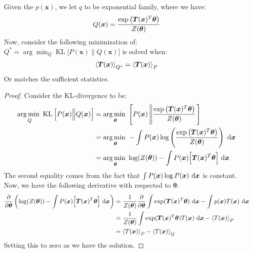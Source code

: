 \begin{proposition}
    Given the $p(\boldsymbol x)$, we let $q$ to be exponential family, where we have:
    \begin{equation*}
        Q(\boldsymbol x) = \frac{\exp\left( \boldsymbol T(\boldsymbol x)^T\boldsymbol \theta \right)}{Z(\boldsymbol \theta)}
    \end{equation*}
    Now, consider the following minimization of: $Q^* = \arg\min_{Q} \operatorname{KL}\Big[ P(\boldsymbol x) \Big\| Q(\boldsymbol x)  \Big]$ is solved when:
    \begin{equation*}
        \left\langle \boldsymbol T(\boldsymbol x) \right\rangle_{Q^*} = \left\langle \boldsymbol T(\boldsymbol x) \right\rangle_P
    \end{equation*}
    Or matches the sufficient statistics. 
\end{proposition}
\begin{proof}
    Consider the KL-divergence to be:
    \begin{equation*}
    \begin{aligned}
        \underset{Q}{\arg\min \ } \operatorname{KL}\Big[ P(\boldsymbol x) \Big\| Q(\boldsymbol x)  \Big] &= \underset{\boldsymbol \theta}{\arg\min \ }\left[  P(\boldsymbol x) \left\| \frac{\exp\left( \boldsymbol T(\boldsymbol x)^T\boldsymbol \theta \right)}{Z(\boldsymbol \theta)} \right. \right] \\
        &= \underset{\boldsymbol \theta}{\arg\min \ } - \int P(\boldsymbol x)\log\left( \frac{\exp\left( \boldsymbol T(\boldsymbol x)^T\boldsymbol \theta \right)}{Z(\boldsymbol \theta)} \right) \ \mathrm{d} \boldsymbol x \\
        &= \underset{\boldsymbol \theta}{\arg\min \ } \log(Z(\boldsymbol \theta)) - \int P(\boldsymbol x)\Big[ \boldsymbol T(\boldsymbol x)^T\boldsymbol \theta \Big] \ \mathrm{d} \boldsymbol x \\
    \end{aligned}
    \end{equation*}
    The second equality comes from the fact that $\int P(\boldsymbol x)\log P(\boldsymbol x)\ \mathrm{d}\boldsymbol x$ is constant. Now, we have the following derivative with respected to $\boldsymbol\theta$:
    \begin{equation*}
    \begin{aligned}
        \frac{\partial}{\partial \boldsymbol \theta}\left( \log(Z(\boldsymbol \theta)) - \int P(\boldsymbol x)\Big[ \boldsymbol T(\boldsymbol x)^T\boldsymbol \theta \Big] \ \mathrm{d} \boldsymbol x  \right) &= \frac{1}{Z(\boldsymbol \theta)}\frac{\partial}{\partial \boldsymbol \theta} \int \exp(\boldsymbol T(\boldsymbol x)^T\boldsymbol \theta)\ \mathrm{d} \boldsymbol x - \int p(\boldsymbol x)T(\boldsymbol x)\ \mathrm{d} \boldsymbol x \\
        &= \frac{1}{Z(\boldsymbol \theta)}\int \exp(\boldsymbol T(\boldsymbol x)^T\boldsymbol \theta) T(\boldsymbol x)\ \mathrm{d} \boldsymbol x - \left\langle T(\boldsymbol x) \right\rangle_{P} \\
        &= \left\langle T(\boldsymbol x) \right\rangle_P - \left\langle T(\boldsymbol x) \right\rangle_Q
    \end{aligned}
    \end{equation*}
    Setting this to zero as we have the solution.  
\end{proof}

